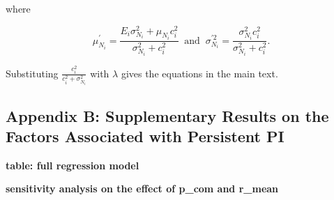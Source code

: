 \documentclass[
  11pt,
]{article}
\begin{document}
where

\begin{equation*}
  \mu_{N_i}^{\prime} = \frac{E_i \sigma_{N_i}^2 + \mu_{N_i} c_i^2}{\sigma_{N_i}^2 + c_i^2} \;\; \text{and} \;\; \sigma_{N_i}^{\prime2} = \frac{\sigma_{N_i}^2 c_i^2}{\sigma_{N_i}^2 + c_i^2}.
\end{equation*}

Substituting \(\frac{c_i^2}{c_i^2 + \sigma_{N_i}^2}\) with \(\lambda\)
gives the equations in the main text.

\hypertarget{appendix-b-supplementary-results-on-the-factors-associated-with-persistent-pi}{%
\subsection{Appendix B: Supplementary Results on the Factors Associated
with Persistent
PI}\label{appendix-b-supplementary-results-on-the-factors-associated-with-persistent-pi}}

\textbf{table: full regression model}

\textbf{sensitivity analysis on the effect of p\_com and r\_mean}
\end{document}
